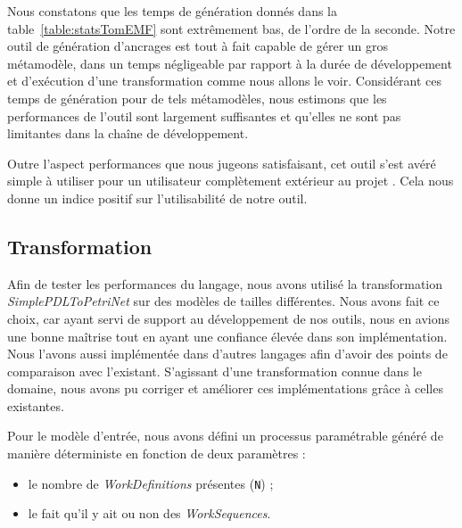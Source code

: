 
Nous constatons que les temps de génération donnés dans la
table~\ref{table:statsTomEMF} sont extrêmement bas, de l'ordre de la seconde.
Notre outil de génération d'ancrages est tout à fait capable de gérer un \og
gros \fg{} métamodèle, dans un temps négligeable par rapport à la durée de
développement et d'exécution d'une transformation comme nous allons le voir.
Considérant ces temps de génération pour de tels métamodèles, nous estimons que
les performances de l'outil {\tomemf} sont largement suffisantes et qu'elles ne
sont pas limitantes dans la chaîne de développement.

Outre l'aspect performances que nous jugeons satisfaisant, cet outil s'est
avéré simple à utiliser pour un utilisateur complètement extérieur au projet
{\tom}. Cela nous donne un indice positif sur l'utilisabilité de notre outil.

\subsection{Transformation}

Afin de tester les performances du langage, nous avons utilisé la
transformation \emph{SimplePDLToPetriNet} sur des modèles de tailles
différentes. Nous avons fait ce choix, car ayant servi de support au
développement de nos outils, nous en avions une bonne maîtrise tout en ayant
une confiance élevée dans son implémentation. Nous l'avons aussi implémentée
dans d'autres langages afin d'avoir des points de comparaison avec l'existant.
S'agissant d'une transformation connue dans le domaine, nous avons pu corriger
et améliorer ces implémentations grâce à celles existantes.

Pour le modèle d'entrée, nous avons défini un processus paramétrable généré de
manière déterministe en fonction de deux paramètres :
\begin{itemize}
  \item le nombre de \emph{WorkDefinitions} présentes (\texttt{N}) ;
  \item le fait qu'il y ait ou non des \emph{WorkSequences}.
\end{itemize}

